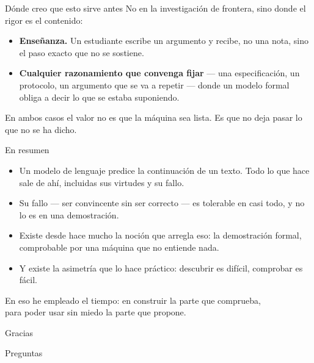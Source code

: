 \documentclass[11pt,aspectratio=169]{beamer}
\begin{document}
\begin{frame}{Dónde creo que esto sirve antes}
  No en la investigación de frontera, sino donde el rigor es el contenido:
  \vfill
  \begin{itemize}
    \item \textbf{Enseñanza.} Un estudiante escribe un argumento y recibe, no
          una nota, sino el paso exacto que no se sostiene.
    \item \textbf{Cualquier razonamiento que convenga fijar} --- una
          especificación, un protocolo, un argumento que se va a repetir ---
          donde un modelo formal obliga a decir lo que se estaba suponiendo.
  \end{itemize}
  \vfill
  En ambos casos el valor no es que la máquina sea lista. Es que no deja pasar
  lo que no se ha dicho.
\end{frame}

\begin{frame}{En resumen}
  \begin{itemize}
    \item Un modelo de lenguaje predice la continuación de un texto. Todo lo
          que hace sale de ahí, incluidas sus virtudes y su fallo.
    \item Su fallo --- ser convincente sin ser correcto --- es tolerable en
          casi todo, y no lo es en una demostración.
    \item Existe desde hace mucho la noción que arregla eso: la demostración
          formal, comprobable por una máquina que no entiende nada.
    \item Y existe la asimetría que lo hace práctico: descubrir es difícil,
          comprobar es fácil.
  \end{itemize}
  \vfill
  \begin{center}
    \large
    En eso he empleado el tiempo: en construir la parte que comprueba,\\
    para poder usar sin miedo la parte que propone.
  \end{center}
\end{frame}

\begin{frame}
  \begin{center}
    \Huge Gracias
  \end{center}
  \vfill
  \begin{center}
    Preguntas
  \end{center}
\end{frame}
\end{document}
